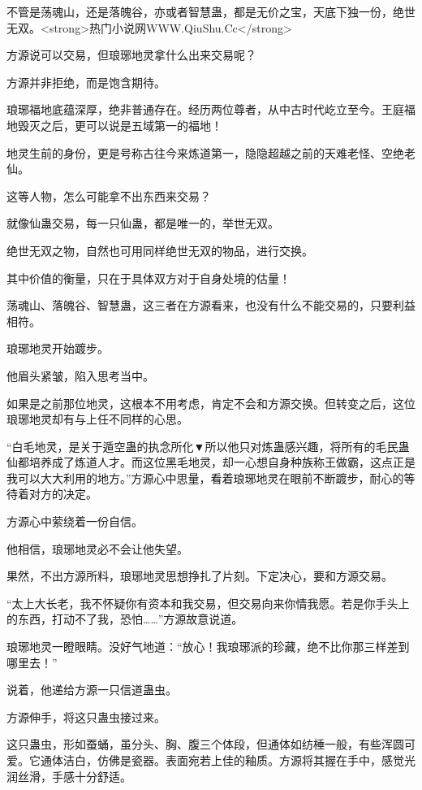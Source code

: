 
\begin{this_body}

不管是荡魂山，还是落魄谷，亦或者智慧蛊，都是无价之宝，天底下独一份，绝世无双。<strong>热门小说网WWW.QiuShu.Cc</strong>

方源说可以交易，但琅琊地灵拿什么出来交易呢？

方源并非拒绝，而是饱含期待。

琅琊福地底蕴深厚，绝非普通存在。经历两位尊者，从中古时代屹立至今。王庭福地毁灭之后，更可以说是五域第一的福地！

地灵生前的身份，更是号称古往今来炼道第一，隐隐超越之前的天难老怪、空绝老仙。

这等人物，怎么可能拿不出东西来交易？

就像仙蛊交易，每一只仙蛊，都是唯一的，举世无双。

绝世无双之物，自然也可用同样绝世无双的物品，进行交换。

其中价值的衡量，只在于具体双方对于自身处境的估量！

荡魂山、落魄谷、智慧蛊，这三者在方源看来，也没有什么不能交易的，只要利益相符。

琅琊地灵开始踱步。

他眉头紧皱，陷入思考当中。

如果是之前那位地灵，这根本不用考虑，肯定不会和方源交换。但转变之后，这位琅琊地灵却有与上任不同样的心思。

“白毛地灵，是关于遁空蛊的执念所化▼所以他只对炼蛊感兴趣，将所有的毛民蛊仙都培养成了炼道人才。而这位黑毛地灵，却一心想自身种族称王做霸，这点正是我可以大大利用的地方。”方源心中思量，看着琅琊地灵在眼前不断踱步，耐心的等待着对方的决定。

方源心中萦绕着一份自信。

他相信，琅琊地灵必不会让他失望。

果然，不出方源所料，琅琊地灵思想挣扎了片刻。下定决心，要和方源交易。

“太上大长老，我不怀疑你有资本和我交易，但交易向来你情我愿。若是你手头上的东西，打动不了我，恐怕……”方源故意说道。

琅琊地灵一瞪眼睛。没好气地道：“放心！我琅琊派的珍藏，绝不比你那三样差到哪里去！”

说着，他递给方源一只信道蛊虫。

方源伸手，将这只蛊虫接过来。

这只蛊虫，形如蚕蛹，虽分头、胸、腹三个体段，但通体如纺棰一般，有些浑圆可爱。它通体洁白，仿佛是瓷器。表面宛若上佳的釉质。方源将其握在手中，感觉光润丝滑，手感十分舒适。


\end{this_body}
